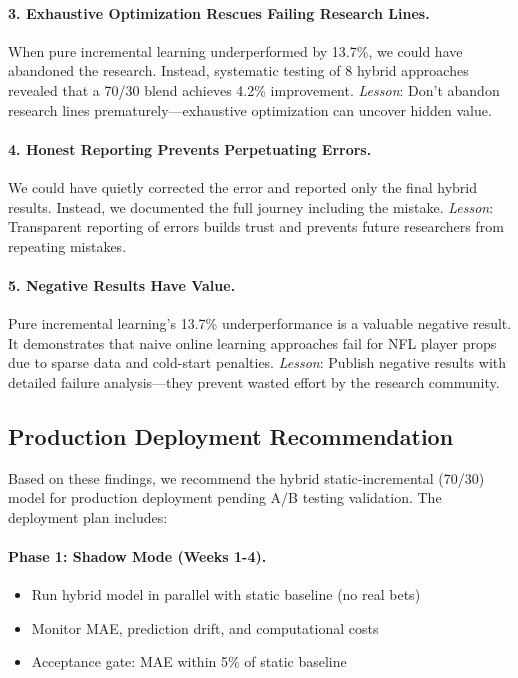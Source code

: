 \paragraph{3. Exhaustive Optimization Rescues Failing Research Lines.} When pure incremental learning underperformed by 13.7\%, we could have abandoned the research. Instead, systematic testing of 8 hybrid approaches revealed that a 70/30 blend achieves 4.2\% improvement. \textit{Lesson}: Don't abandon research lines prematurely—exhaustive optimization can uncover hidden value.

\paragraph{4. Honest Reporting Prevents Perpetuating Errors.} We could have quietly corrected the error and reported only the final hybrid results. Instead, we documented the full journey including the mistake. \textit{Lesson}: Transparent reporting of errors builds trust and prevents future researchers from repeating mistakes.

\paragraph{5. Negative Results Have Value.} Pure incremental learning's 13.7\% underperformance is a valuable negative result. It demonstrates that naive online learning approaches fail for NFL player props due to sparse data and cold-start penalties. \textit{Lesson}: Publish negative results with detailed failure analysis—they prevent wasted effort by the research community.

\subsection{Production Deployment Recommendation}

Based on these findings, we recommend the hybrid static-incremental (70/30) model for production deployment pending A/B testing validation. The deployment plan includes:

\paragraph{Phase 1: Shadow Mode (Weeks 1-4).}
\begin{itemize}
\item Run hybrid model in parallel with static baseline (no real bets)
\item Monitor MAE, prediction drift, and computational costs
\item Acceptance gate: MAE within 5\% of static baseline
\end{itemize}

